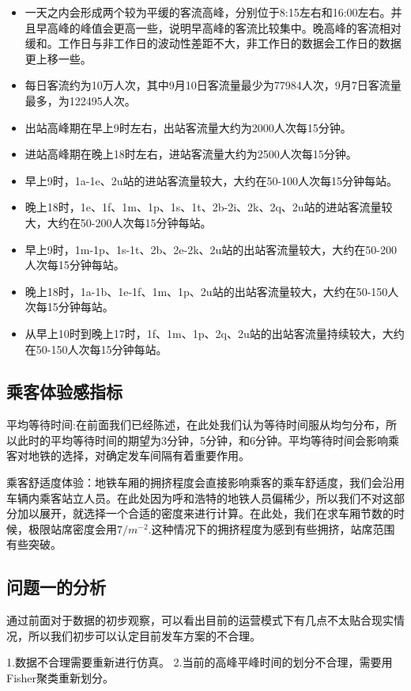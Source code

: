 \documentclass[12pt,a4paper]{mcmthesis}
\begin{document}
\begin{itemize}
	\item 一天之内会形成两个较为平缓的客流高峰，分别位于8:15左右和16:00左右。并且早高峰的峰值会更高一些，说明早高峰的客流比较集中。晚高峰的客流相对缓和。工作日与非工作日的波动性差距不大，非工作日的数据会工作日的数据更上移一些。
	\item 每日客流约为10万人次，其中9月10日客流量最少为77984人次，9月7日客流量最多，为122495人次。
	\item 出站高峰期在早上9时左右，出站客流量大约为2000人次每15分钟。
	\item 进站高峰期在晚上18时左右，进站客流量大约为2500人次每15分钟。
	\item 早上9时，1a-1e、2u站的进站客流量较大，大约在50-100人次每15分钟每站。
	\item 晚上18时，1e、1f、1m、1p、1s、1t、2b-2i、2k、2q、2u站的进站客流量较大，大约在50-200人次每15分钟每站。
	\item 早上9时，1m-1p、1s-1t、2b、2e-2k、2u站的出站客流量较大，大约在50-200人次每15分钟每站。
	\item 晚上18时，1a-1b、1e-1f、1m、1p、2u站的出站客流量较大，大约在50-150人次每15分钟每站。
	\item 从早上10时到晚上17时，1f、1m、1p、2q、2u站的出站客流量持续较大，大约在50-150人次每15分钟每站。
\end{itemize}

\subsection{乘客体验感指标}
平均等待时间:在前面我们已经陈述，在此处我们认为等待时间服从均匀分布，所以此时的平均等待时间的期望为3分钟，5分钟，和6分钟。平均等待时间会影响乘客对地铁的选择，对确定发车间隔有着重要作用。

乘客舒适度体验：地铁车厢的拥挤程度会直接影响乘客的乘车舒适度，我们会沿用车辆内乘客站立人员。在此处因为呼和浩特的地铁人员偏稀少，所以我们不对这部分加以展开，就选择一个合适的密度来进行计算。在此处，我们在求车厢节数的时候，极限站席密度会用$7/m^{-2}$.这种情况下的拥挤程度为感到有些拥挤，站席范围有些突破。

\subsection{问题一的分析}

 通过前面对于数据的初步观察，可以看出目前的运营模式下有几点不太贴合现实情况，所以我们初步可以认定目前发车方案的不合理。
 
 1.数据不合理需要重新进行仿真。
 2.当前的高峰平峰时间的划分不合理，需要用Fisher聚类重新划分。
 
\end{document}
